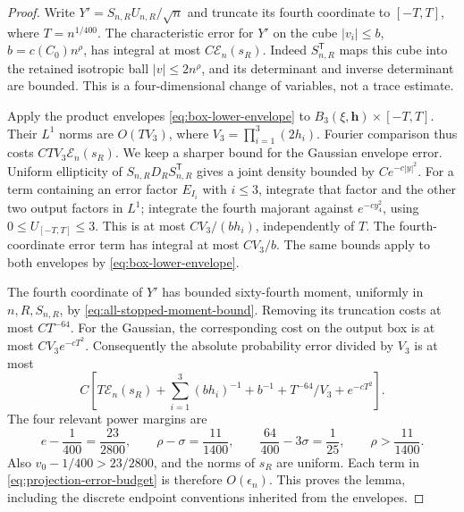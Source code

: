 \begin{proof}
Write $Y'=S_{n,R}U_{n,R}/\sqrt n$ and truncate its fourth coordinate
to $[-T,T]$, where $T=n^{1/400}$. The characteristic error for $Y'$
on the cube $|v_i|\le b$, $b=c(C_0)n^\rho$, has integral at most
$C\mathcal E_n(s_R)$. Indeed $S_{n,R}^{\mathsf T}$ maps this cube
into the retained isotropic ball $|v|\le2n^\rho$, and its determinant
and inverse determinant are bounded. This is a four-dimensional
change of variables, not a trace estimate.

Apply the product envelopes \eqref{eq:box-lower-envelope} to
$B_3(\xi,\mathbf h)\times[-T,T]$. Their $L^1$ norms are
$O(TV_3)$, where $V_3=\prod_{i=1}^3(2h_i)$. Fourier comparison thus
costs $CT V_3\mathcal E_n(s_R)$. We keep a sharper bound for the
Gaussian envelope error. Uniform ellipticity of $S_{n,R}D_RS_{n,R}^{\mathsf T}$
gives a joint density bounded by $Ce^{-c|y|^2}$. For a term containing
an error factor $E_{I_i}$ with $i\le3$, integrate that factor and
the other two output factors in $L^1$; integrate the fourth majorant
against $e^{-cy_4^2}$, using $0\le U_{[-T,T]}\le3$. This is at most
$C V_3/(bh_i)$, independently of $T$. The fourth-coordinate error
term has integral at most $CV_3/b$. The same bounds apply to both
envelopes by \eqref{eq:box-lower-envelope}.

The fourth coordinate of $Y'$ has bounded sixty-fourth moment,
uniformly in $n,R,S_{n,R}$, by
\eqref{eq:all-stopped-moment-bound}. Removing its truncation costs
at most $C T^{-64}$. For the Gaussian, the corresponding cost on
the output box is at most $C V_3 e^{-cT^2}$. Consequently the
absolute probability error divided by $V_3$ is at most
\begin{equation}\label{eq:projection-error-budget}
 C\left[T\mathcal E_n(s_R)+\sum_{i=1}^3(bh_i)^{-1}+b^{-1}
                     +T^{-64}/V_3+e^{-cT^2}\right].
\end{equation}
The four relevant power margins are
\[
 e-\frac1{400}=\frac{23}{2800},\qquad
 \rho-\sigma=\frac{11}{1400},\qquad
 \frac{64}{400}-3\sigma=\frac1{25},\qquad \rho>\frac{11}{1400}.
\]
Also $v_0-1/400>23/2800$, and the norms of $s_R$ are uniform.
Each term in \eqref{eq:projection-error-budget} is therefore
$O(\epsilon_n)$. This proves the lemma, including the discrete endpoint
conventions inherited from the envelopes.
\end{proof}

